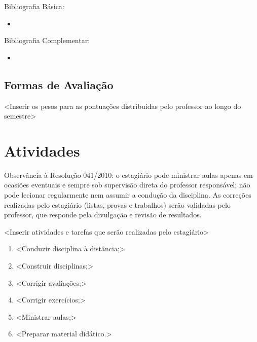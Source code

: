 \documentclass[12pt, a4paper]{article}
\begin{document}


Bibliografia Básica:

\begin{itemize}
    \item <Inserir bibliografia básica>
\end{itemize}

Bibliografia Complementar:

\begin{itemize}
    \item <Inserir bibliografia complementar>
\end{itemize}

\subsection{Formas de Avaliação} \label{subsec:avaliacoes}

<Inserir os pesos para as pontuações distribuídas pelo professor ao longo do semestre>


\section{Atividades} \label{sec:atividades}


Observância à Resolução 041/2010: o estagiário pode ministrar aulas apenas em ocasiões eventuais e sempre sob supervisão direta do professor responsável; não pode lecionar regularmente nem assumir a condução da disciplina. As correções realizadas pelo estagiário (listas, provas e trabalhos) serão validadas pelo professor, que responde pela divulgação e revisão de resultados.

<Inserir atividades e tarefas que serão realizadas pelo estagiário>

\begin{enumerate}
    \item <Conduzir disciplina à distância;>
    \item <Construir disciplinas;>
    \item <Corrigir avaliações;>
    \item <Corrigir exercícios;>
    \item <Ministrar aulas;>
    \item <Preparar material didático.>
\end{enumerate}
\end{document}

